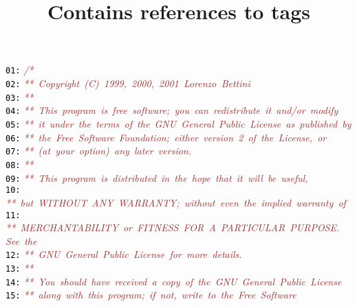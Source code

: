 \documentclass{article}
\title{Contains references to tags}
\date{}
\begin{document}
\maketitle
\noindent
\mbox{}\texttt{\textcolor{Black}{01:}} \textit{\textcolor{Brown}{/*}} \\
\mbox{}\texttt{\textcolor{Black}{02:}} \textit{\textcolor{Brown}{**\ Copyright\ (C)\ 1999,\ 2000,\ 2001\ Lorenzo\ Bettini}} \\
\mbox{}\texttt{\textcolor{Black}{03:}} \textit{\textcolor{Brown}{**\ \ }} \\
\mbox{}\texttt{\textcolor{Black}{04:}} \textit{\textcolor{Brown}{**\ This\ program\ is\ free\ software;\ you\ can\ redistribute\ it\ and/or\ modify}} \\
\mbox{}\texttt{\textcolor{Black}{05:}} \textit{\textcolor{Brown}{**\ it\ under\ the\ terms\ of\ the\ GNU\ General\ Public\ License\ as\ published\ by}} \\
\mbox{}\texttt{\textcolor{Black}{06:}} \textit{\textcolor{Brown}{**\ the\ Free\ Software\ Foundation;\ either\ version\ 2\ of\ the\ License,\ or}} \\
\mbox{}\texttt{\textcolor{Black}{07:}} \textit{\textcolor{Brown}{**\ (at\ your\ option)\ any\ later\ version.}} \\
\mbox{}\texttt{\textcolor{Black}{08:}} \textit{\textcolor{Brown}{**\ \ }} \\
\mbox{}\texttt{\textcolor{Black}{09:}} \textit{\textcolor{Brown}{**\ This\ program\ is\ distributed\ in\ the\ hope\ that\ it\ will\ be\ useful,}} \\
\mbox{}\texttt{\textcolor{Black}{10:}} \textit{\textcolor{Brown}{**\ but\ WITHOUT\ ANY\ WARRANTY;\ without\ even\ the\ implied\ warranty\ of}} \\
\mbox{}\texttt{\textcolor{Black}{11:}} \textit{\textcolor{Brown}{**\ MERCHANTABILITY\ or\ FITNESS\ FOR\ A\ PARTICULAR\ PURPOSE.\ \ See\ the}} \\
\mbox{}\texttt{\textcolor{Black}{12:}} \textit{\textcolor{Brown}{**\ GNU\ General\ Public\ License\ for\ more\ details.}} \\
\mbox{}\texttt{\textcolor{Black}{13:}} \textit{\textcolor{Brown}{**\ \ }} \\
\mbox{}\texttt{\textcolor{Black}{14:}} \textit{\textcolor{Brown}{**\ You\ should\ have\ received\ a\ copy\ of\ the\ GNU\ General\ Public\ License}} \\
\mbox{}\texttt{\textcolor{Black}{15:}} \textit{\textcolor{Brown}{**\ along\ with\ this\ program;\ if\ not,\ write\ to\ the\ Free\ Software}} \\
\end{document}
